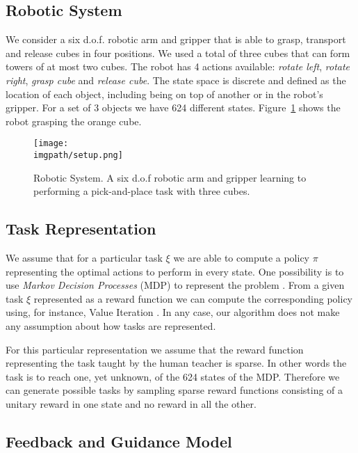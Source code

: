 \subsection{Robotic System}

We consider a six d.o.f. robotic arm and gripper that is able to grasp, transport and release cubes in four positions. We used a total of three cubes that can form towers of at most two cubes.  The robot has 4 actions available: \textit{rotate left}, \textit{rotate right}, \textit{grasp cube} and \textit{release cube}. The state space is discrete and defined as the location of each object, including being on top of another or in the robot's gripper. For a set of 3 objects we have 624 different states. Figure~\ref{fig:lfui:setup} shows the robot grasping the orange cube. 

\begin{figure}[!ht]
  \centering
  \texttt{[image: \\imgpath/setup.png]}
  \caption{Robotic System. A six d.o.f robotic arm and gripper learning to performing a pick-and-place task with three cubes.}
  \label{fig:lfui:setup}
\end{figure}

\subsection{Task Representation}

We assume that for a particular task $\xi$ we are able to compute a policy $\pi$ representing the optimal actions to perform in every state. One possibility is to use \textit{Markov Decision Processes} (MDP) to represent the problem \cite{sutton1998reinforcement}. From a given task $\xi$ represented as a reward function we can compute the corresponding policy using, for instance, Value Iteration \cite{sutton1998reinforcement}. In any case, our algorithm does not make any assumption about how tasks are represented.

For this particular representation we assume that the reward function representing the task taught by the human teacher is sparse. In other words the task is to reach one, yet unknown, of the 624 states of the MDP. Therefore we can generate possible tasks by sampling sparse reward functions consisting of a unitary reward in one state and no reward in all the other. 

\subsection{Feedback and Guidance Model}
\label{chapter:lfui:framemodels}


